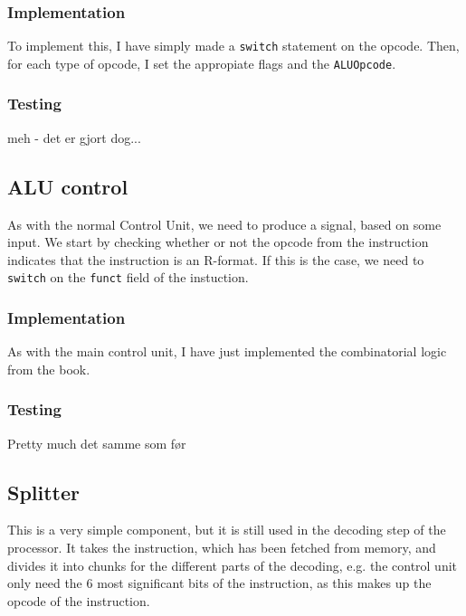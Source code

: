 \subsubsection*{Implementation}
To implement this, I have simply made a \texttt{switch} statement on the
opcode. Then, for each type of opcode, I set the appropiate flags and the
\texttt{ALUOpcode}.

\subsubsection*{Testing}
meh - det er gjort dog...

\subsection{ALU control}\label{sec:alu-control}
As with the normal Control Unit, we need to produce a signal, based on some input. We start by checking whether or not the opcode from the instruction indicates that the instruction is an R-format. If this is the case, we need to \texttt{switch} on the \texttt{funct} field of the instuction.

\subsubsection*{Implementation}
As with the main control unit, I have just implemented the combinatorial logic
from the book.

\subsubsection*{Testing}
Pretty much det samme som før

\subsection{Splitter}
This is a very simple component, but it is still used in the decoding step of
the processor. It takes the instruction, which has been fetched from memory,
and divides it into chunks for the different parts of the decoding, e.g. the
control unit only need the 6 most significant bits of the instruction, as this
makes up the opcode of the instruction.

